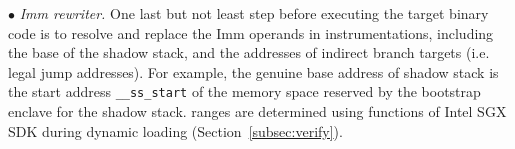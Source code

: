 \vspace{2pt}\noindent$\bullet$\textit{ Imm rewriter.}\label{subsec:immrewriter} One last but not least step before executing the target binary code is to resolve and replace the Imm operands in instrumentations, including the base of the shadow stack, and the addresses of indirect branch targets (i.e. legal jump addresses). For example, the genuine base address of shadow stack is the start address \verb|__ss_start| of the memory space reserved by the bootstrap enclave for the shadow stack. \DIFdelbegin {}\DIFdelend \DIFaddbegin {}\DIFaddend ranges are determined using functions of Intel SGX SDK during dynamic loading (Section~\ref{subsec:verify}).
\DIFdelbegin {}\DIFdelend 

 \DIFdelbegin %
\DIFdelend